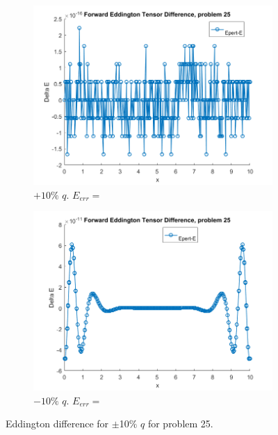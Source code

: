 \documentclass{article}
\begin{document}
\begin{figure}[H]
\centering
\begin{subfigure}{.5\textwidth}
  \centering
  \includegraphics[width=1\linewidth]{p25deltaEdq10.png}
  \caption{$+10\%$ $q$. $E_{err}=$}
  \label{fig:sub1}
\end{subfigure}%
\begin{subfigure}{.5\textwidth}
  \centering
  \includegraphics[width=1\linewidth]{p25deltaEdq-10.png}
  \caption{$-10\%$ $q$. $E_{err}=$}
  \label{fig:sub2}
\end{subfigure}
\caption{Eddington difference for $\pm$10$\%$ $q$ for problem 25.}
\label{fig:test}
\end{figure}
\end{document}
